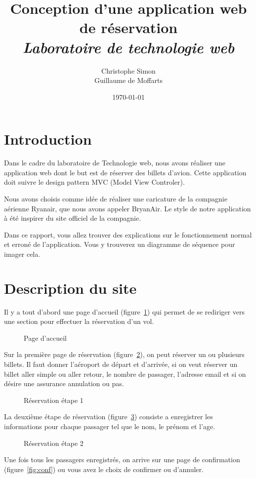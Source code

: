 \documentclass[12pt,a4paper]{article}
\title{Conception d'une application web de réservation\\[3mm] \normalsize{\it Laboratoire de technologie web}}
\author{Christophe Simon \\ Guillaume de Moffarts}
\date{\today}
\begin{document}
	\maketitle
	\section*{Introduction}
		Dans le cadre du laboratoire de Technologie web, nous avons réaliser une application web dont le but est de réserver des billets d'avion. Cette application doit suivre le design pattern MVC (Model View Controler).

		Nous avons choisis comme idée de réaliser une caricature de la compagnie aérienne Ryanair, que nous avons appeler BryanAir. Le style de notre application à été inspirer du site officiel de la compagnie.

		Dans ce rapport, vous allez trouver des explications sur le fonctionnement normal et erroné de l'application. Vous y trouverez un diagramme de séquence pour imager cela.


	\section{Description du site}
		Il y a tout d'abord une page d'accueil (figure~\ref{fig:home}) qui permet de se rediriger vers une section pour effectuer la réservation d'un vol.
		\begin{figure}
			\caption{Page d'accueil}
			\label{fig:home}
		\end{figure}

		Sur la première page de réservation (figure~\ref{fig:res1}), on peut réserver un ou plusieurs billets. Il faut donner l'aéroport de départ et d'arrivée, si on veut réserver un billet aller simple ou aller retour, le nombre de passager, l'adresse email et si on désire une assurance annulation ou pas.
		\begin{figure}
			\caption{Réservation étape 1}
			\label{fig:res1}
		\end{figure}

		La deuxième étape de réservation (figure~\ref{fig:res2}) consiste a enregistrer les informations pour chaque passager tel que le nom, le prénom et l'age.
		\begin{figure}
			\caption{Réservation étape 2}
			\label{fig:res2}
		\end{figure}

		Une fois tous les passagers enregistrés, on arrive sur une page de confirmation (figure~\ref{fig:conf}) ou vous avez le choix de confirmer ou d'annuler.
\end{document}
